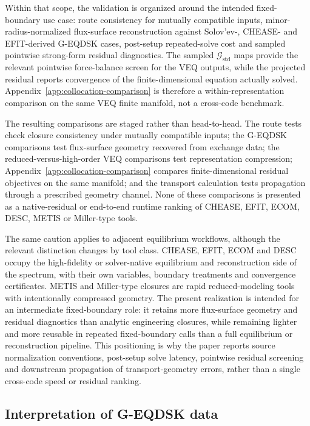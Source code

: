 \documentclass[final, 3p, times]{elsarticle}
\begin{document}
Within that scope, the validation is organized around the intended fixed-boundary use case: route consistency for mutually compatible inputs, minor-radius-normalized flux-surface reconstruction against Solov'ev-, CHEASE- and EFIT-derived G-EQDSK cases, post-setup repeated-solve cost and sampled pointwise strong-form residual diagnostics. The sampled $\mathcal{G}_{\mathrm{std}}$ maps provide the relevant pointwise force-balance screen for the VEQ outputs, while the projected residual reports convergence of the finite-dimensional equation actually solved. Appendix~\ref{app:collocation-comparison} is therefore a within-representation comparison on the same VEQ finite manifold, not a cross-code benchmark.

The resulting comparisons are staged rather than head-to-head. The route tests check closure consistency under mutually compatible inputs; the G-EQDSK comparisons test flux-surface geometry recovered from exchange data; the reduced-versus-high-order VEQ comparisons test representation compression; Appendix~\ref{app:collocation-comparison} compares finite-dimensional residual objectives on the same manifold; and the transport calculation tests propagation through a prescribed geometry channel. None of these comparisons is presented as a native-residual or end-to-end runtime ranking of CHEASE, EFIT, ECOM, DESC, METIS or Miller-type tools.

The same caution applies to adjacent equilibrium workflows, although the relevant distinction changes by tool class. CHEASE, EFIT, ECOM and DESC occupy the high-fidelity or solver-native equilibrium and reconstruction side of the spectrum, with their own variables, boundary treatments and convergence certificates. METIS and Miller-type closures are rapid reduced-modeling tools with intentionally compressed geometry. The present realization is intended for an intermediate fixed-boundary role: it retains more flux-surface geometry and residual diagnostics than analytic engineering closures, while remaining lighter and more reusable in repeated fixed-boundary calls than a full equilibrium or reconstruction pipeline. This positioning is why the paper reports source normalization conventions, post-setup solve latency, pointwise residual screening and downstream propagation of transport-geometry errors, rather than a single cross-code speed or residual ranking.

\subsection{Interpretation of G-EQDSK data}
\label{sec:geqdsk-interpretation}
\end{document}

